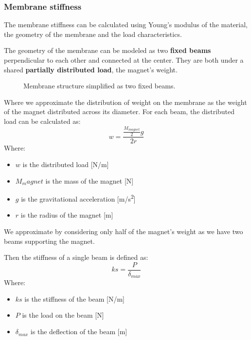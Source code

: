 \subsubsection{Membrane stiffness}
\label{sec: Membrane_stiffness}
The membrane stiffness can be calculated using Young's modulus of the material, the geometry of the membrane and the load characteristics.

The geometry of the membrane can be modeled as two \textbf{fixed beams} perpendicular to each other and connected at the center.
They are both under a shared \textbf{partially distributed load}, the magnet's weight.
\begin{figure}
    \centering
    \caption{Membrane structure simplified as two fixed beams.}
    \label{fig: Membrane_structure_simplified}
\end{figure}

Where we approximate the distribution of weight on the membrane as the weight of the magnet distributed across its diameter.
For each beam, the distributed load can be calculated as:
\begin{equation}
    w = \frac{\frac{M_{magnet}}{2} g}{2 r}
\end{equation}
Where:
\begin{itemize}
    \item $w$ is the distributed load [N/m]
    \item $M_magnet$ is the mass of the magnet [N]
    \item $g$ is the gravitational acceleration [m/s\textsuperscript{2}]
    \item $r$ is the radius of the magnet [m]
\end{itemize}

We approximate by considering only half of the magnet's weight as we have two beams supporting the magnet.

Then the stiffness of a single beam is defined as:
\begin{equation}
    ks = \frac{P}{\delta_{max}}
\end{equation}
Where:
\begin{itemize}
    \item $ks$ is the stiffness of the beam [N/m]
    \item $P$ is the load on the beam [N]
    \item $\delta_{max}$ is the deflection of the beam [m]
\end{itemize}

